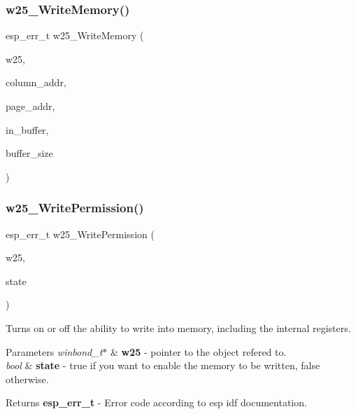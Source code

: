\subsubsection{w25\+\_\+\+Write\+Memory()}
{\footnotesize\ttfamily esp\+\_\+err\+\_\+t w25\+\_\+\+Write\+Memory (\begin{DoxyParamCaption}\item[{const \textbf{ winbond\+\_\+t} $\ast$}]{w25,  }\item[{uint16\+\_\+t}]{column\+\_\+addr,  }\item[{uint16\+\_\+t}]{page\+\_\+addr,  }\item[{const uint8\+\_\+t $\ast$}]{in\+\_\+buffer,  }\item[{size\+\_\+t}]{buffer\+\_\+size }\end{DoxyParamCaption})}

\mbox{\label{_w25_n01_g_v_8h_ad960b1f5fdf503e9d39f5acd300e9a17}} 
\subsubsection{w25\+\_\+\+Write\+Permission()}
{\footnotesize\ttfamily esp\+\_\+err\+\_\+t w25\+\_\+\+Write\+Permission (\begin{DoxyParamCaption}\item[{const \textbf{ winbond\+\_\+t} $\ast$}]{w25,  }\item[{bool}]{state }\end{DoxyParamCaption})}

Turns on or off the ability to write into memory, including the internal registers. 
\begin{DoxyParams}{Parameters}
{\em winbond\+\_\+t$\ast$} & {\bfseries w25} -\/ pointer to the object refered to. \\
\hline
{\em bool} & {\bfseries state} -\/ true if you want to enable the memory to be written, false otherwise. \\
\hline
\end{DoxyParams}
\begin{DoxyReturn}{Returns}
{\bfseries esp\+\_\+err\+\_\+t} -\/ Error code according to esp idf documentation. 
\end{DoxyReturn}
\mbox{\label{_w25_n01_g_v_8h_ac46e161fd2422285ae40bb6f52fb8d41}} 
